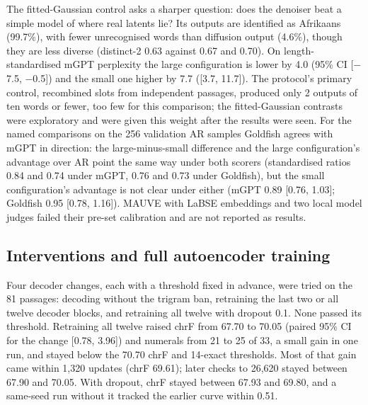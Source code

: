 \documentclass[11pt,a4paper]{article}
\begin{document}
The fitted-Gaussian control asks a sharper question: does the denoiser beat a simple model of where real latents lie? Its outputs are identified as Afrikaans (99.7\%), with fewer unrecognised words than diffusion output (4.6\%), though they are less diverse (distinct-2 0.63 against 0.67 and 0.70). On length-standardised mGPT perplexity the large configuration is lower by 4.0 (95\% CI [$-$7.5, $-$0.5]) and the small one higher by 7.7 ([3.7, 11.7]). The protocol's primary control, recombined slots from independent passages, produced only 2 outputs of ten words or fewer, too few for this comparison; the fitted-Gaussian contrasts were exploratory and were given this weight after the results were seen. For the named comparisons on the 256 validation AR samples Goldfish agrees with mGPT in direction: the large-minus-small difference and the large configuration's advantage over AR point the same way under both scorers (standardised ratios 0.84 and 0.74 under mGPT, 0.76 and 0.73 under Goldfish), but the small configuration's advantage is not clear under either (mGPT 0.89 [0.76, 1.03]; Goldfish 0.95 [0.78, 1.16]). MAUVE \citep{pillutla2021mauve} with LaBSE embeddings \citep{feng2022labse} and two local model judges failed their pre-set calibration and are not reported as results.

\subsection{Interventions and full autoencoder training}
\label{sec:res-aescreen}

Four decoder changes, each with a threshold fixed in advance, were tried on the 81 passages: decoding without the trigram ban, retraining the last two or all twelve decoder blocks, and retraining all twelve with dropout 0.1. None passed its threshold. Retraining all twelve raised chrF from 67.70 to 70.05 (paired 95\% CI for the change [0.78, 3.96]) and numerals from 21 to 25 of 33, a small gain in one run, and stayed below the 70.70 chrF and 14-exact thresholds. Most of that gain came within 1,320 updates (chrF 69.61); later checks to 26,620 stayed between 67.90 and 70.05. With dropout, chrF stayed between 67.93 and 69.80, and a same-seed run without it tracked the earlier curve within 0.51.
\end{document}
